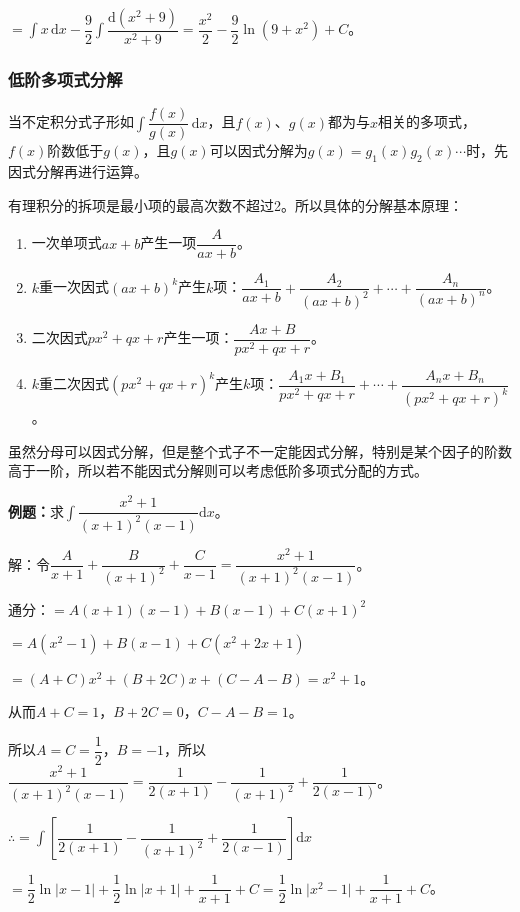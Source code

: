 \documentclass[UTF8, 12pt]{ctexart}
\begin{document}
$\displaystyle{=\int x\,\textrm{d}x-\dfrac{9}{2}\int\dfrac{\textrm{d}(x^2+9)}{x^2+9}}=\dfrac{x^2}{2}-\dfrac{9}{2}\ln(9+x^2)+C$。

\subsubsection{低阶多项式分解}

当不定积分式子形如$\displaystyle{\int\dfrac{f(x)}{g(x)}\,\textrm{d}x}$，且$f(x)$、$g(x)$都为与$x$相关的多项式，$f(x)$阶数低于$g(x)$，且$g(x)$可以因式分解为$g(x)=g_1(x)g_2(x)\cdots$时，先因式分解再进行运算。

有理积分的拆项是最小项的最高次数不超过2。所以具体的分解基本原理：

\begin{enumerate}
    \item 一次单项式$ax+b$产生一项$\dfrac{A}{ax+b}$。
    \item $k$重一次因式$(ax+b)^k$产生$k$项：$\dfrac{A_1}{ax+b}+\dfrac{A_2}{(ax+b)^2}+\cdots+\dfrac{A_n}{(ax+b)^n}$。
    \item 二次因式$px^2+qx+r$产生一项：$\dfrac{Ax+B}{px^2+qx+r}$。
    \item $k$重二次因式$(px^2+qx+r)^k$产生$k$项：$\dfrac{A_1x+B_1}{px^2+qx+r}+\cdots+\dfrac{A_nx+B_n}{(px^2+qx+r)^k}$。
\end{enumerate}

虽然分母可以因式分解，但是整个式子不一定能因式分解，特别是某个因子的阶数高于一阶，所以若不能因式分解则可以考虑低阶多项式分配的方式。

\textbf{例题：}求$\displaystyle{\int\dfrac{x^2+1}{(x+1)^2(x-1)}\textrm{d}x}$。\medskip

解：令$\dfrac{A}{x+1}+\dfrac{B}{(x+1)^2}+\dfrac{C}{x-1}=\dfrac{x^2+1}{(x+1)^2(x-1)}$。 \medskip

通分：$=A(x+1)(x-1)+B(x-1)+C(x+1)^2$

$=A(x^2-1)+B(x-1)+C(x^2+2x+1)$

$=(A+C)x^2+(B+2C)x+(C-A-B)=x^2+1$。

从而$A+C=1$，$B+2C=0$，$C-A-B=1$。

所以$A=C=\dfrac{1}{2}$，$B=-1$，所以$\dfrac{x^2+1}{(x+1)^2(x-1)}=\dfrac{1}{2(x+1)}-\dfrac{1}{(x+1)^2}+\dfrac{1}{2(x-1)}$。

$\therefore=\displaystyle{\int\left[\dfrac{1}{2(x+1)}-\dfrac{1}{(x+1)^2}+\dfrac{1}{2(x-1)}\right]\textrm{d}x}$ \medskip

$=\dfrac{1}{2}\ln\vert x-1\vert+\dfrac{1}{2}\ln\vert x+1\vert+\dfrac{1}{x+1}+C=\dfrac{1}{2}\ln\vert x^2-1\vert+\dfrac{1}{x+1}+C$。
\end{document}
